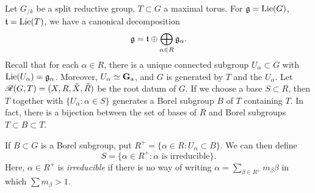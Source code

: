 Let $G_{/k}$ be a split reductive group, $T\subset G$ a maximal torus. For 
$\mathfrak{g}=\operatorname{Lie}(G)$, $\mathfrak{t}=\operatorname{Lie}(T)$, we have a canonical decomposition 
\[
  \mathfrak{g} = \mathfrak{t}\oplus \bigoplus_{\alpha\in R} \mathfrak{g}_\alpha .
\]
Recall that for each $\alpha\in R$, there is a unique connected subgroup 
$U_\alpha\subset G$ with $\operatorname{Lie}(U_\alpha)=\mathfrak{g}_\alpha$. Moreover, 
$U_\alpha\simeq \mathbf{G}_\mathrm{a}$, and $G$ is generated by $T$ and the $U_\alpha$. 
Let $\mathscr{R}(G,T)=(X,R,\check X,\check R)$ be the root datum of $G$. If we choose 
a base $S\subset R$, then $T$ together with $\{U_\alpha:\alpha\in S\}$ 
generates a Borel subgroup $B$ of $T$ containing $T$. In fact, there is a 
bijection between the set of bases of $R$ and Borel subgroups 
$T\subset B\subset T$. 

If $B\subset G$ is a Borel subgroup, put 
$R^+=\{\alpha\in R:U_\alpha\subset B\}$. We can then define 
\[
  S = \{\alpha\in R^+:\alpha\text{ is irreducible}\} .
\]
Here, $\alpha\in R^+$ is \emph{irreducible} if there is no way of writing 
$\alpha=\sum_{\beta\in R^+} m_\beta \beta$ in which $\sum m_\beta>1$. 

